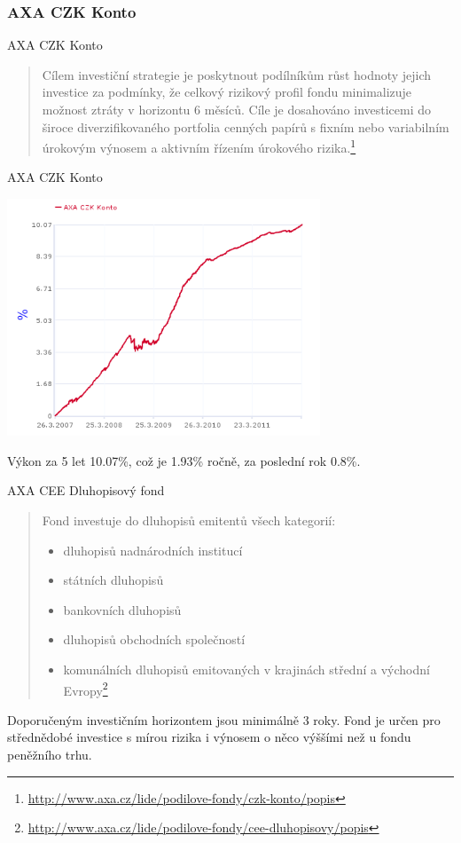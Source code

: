 \documentclass[xcolor=dvipsnames]{beamer}
\begin{document}
		\subsubsection{AXA CZK Konto}
			\begin{frame}{AXA CZK Konto}
				\begin{quote}
				Cílem investiční strategie je poskytnout podílníkům růst hodnoty jejich investice za podmínky, že celkový rizikový profil fondu minimalizuje možnost ztráty v horizontu 6 měsíců. Cíle je dosahováno investicemi do široce diverzifikovaného portfolia cenných papírů s fixním nebo variabilním úrokovým výnosem a aktivním řízením úrokového rizika.\footnote{\url{http://www.axa.cz/lide/podilove-fondy/czk-konto/popis}}
				\end{quote}
			\end{frame}
			\begin{frame}{AXA CZK Konto}
				\begin{center}
					\includegraphics[width=0.7\textwidth]{axa_czk_konto.png}
				\end{center}							
				Výkon za 5 let 10.07\%, což je 1.93\% ročně, za poslední rok 0.8\%.
			\end{frame}
			\begin{frame}{AXA CEE Dluhopisový fond}
			\begin{quote}
				Fond investuje do dluhopisů emitentů všech kategorií:
				\begin{itemize}
			    \item dluhopisů nadnárodních institucí
			    \item státních dluhopisů
			    \item bankovních dluhopisů
			    \item dluhopisů obchodních společností
			    \item komunálních dluhopisů emitovaných v krajinách střední a východní Evropy\footnote{\url{http://www.axa.cz/lide/podilove-fondy/cee-dluhopisovy/popis}}	
    	  \end{itemize}
		  \end{quote}
		  Doporučeným investičním horizontem jsou minimálně 3 roky. Fond je určen pro střednědobé investice s mírou rizika i výnosem o něco výššími než u fondu peněžního trhu.
			\end{frame}
\end{document}
